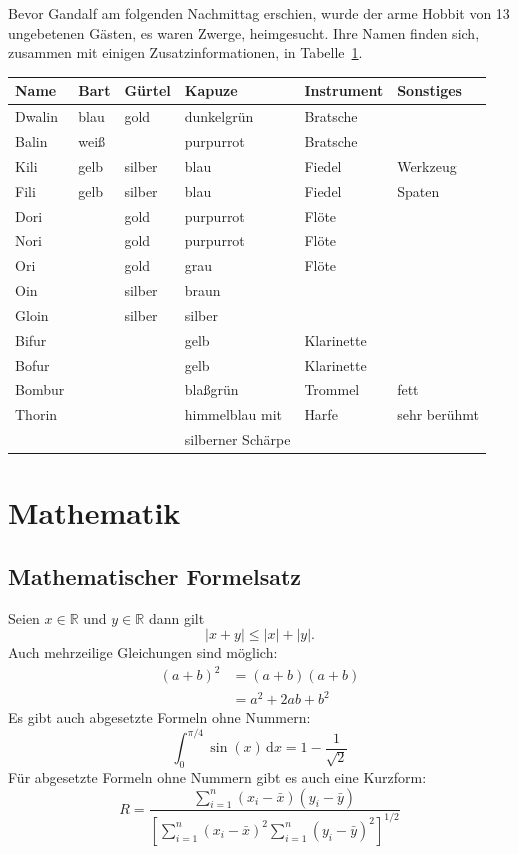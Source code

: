 \documentclass[12pt,a4paper,bibtotoc]{scrreprt}
\begin{document}
Bevor Gandalf am folgenden Nachmittag erschien, wurde der arme Hobbit
von 13 ungebetenen Gästen, es waren Zwerge, heimgesucht. Ihre Namen
finden sich, zusammen mit einigen Zusatzinformationen, in
Tabelle~\ref{tab:zwerge}.
% 
\begin{table}
  \centering
  \label{tab:zwerge}
  \begin{tabular}{l||l|l|l|l|l}
  Name   & Bart & Gürtel & Kapuze & Instrument & Sonstiges \\
  \hline
  Dwalin & blau & gold & dunkelgrün & Bratsche & \\
  Balin & weiß & & purpurrot & Bratsche & \\
  Kili & gelb & silber & blau & Fiedel & Werkzeug \\
  Fili & gelb & silber & blau & Fiedel & Spaten \\
  Dori & & gold & purpurrot & Flöte & \\
  Nori & & gold & purpurrot & Flöte & \\
  Ori & & gold & grau & Flöte & \\
  Oin & & silber & braun & & \\
  Gloin & & silber & silber & & \\
  Bifur & & & gelb & Klarinette & \\
  Bofur & & & gelb & Klarinette & \\
  Bombur & & & blaßgrün & Trommel & fett \\
  Thorin & & & himmelblau mit & Harfe & sehr berühmt \\
         & & & silberner Schärpe & &
  \end{tabular}
\end{table}
%
\chapter{Mathematik}
\label{chap:mathematik}
%
\section{Mathematischer Formelsatz}
Seien \begin{math}x\in\mathbb{R}\end{math} und
$y\in\mathbb{R}$ dann gilt
%
\begin{equation}
  |x+y| \leq |x| + |y|.
\end{equation}
%
Auch mehrzeilige Gleichungen sind möglich:
%
\begin{align}
  (a+b)^{2} & = (a+b)(a+b) \\
           & = a^{2}+2ab+b^{2}
\end{align}
Es gibt auch abgesetzte Formeln ohne Nummern:
%
\begin{equation*}
  \int_{0}^{\pi/4}\sin(x)\,\mathrm{d}x=
  1-\frac{1}{\sqrt{2}}
\end{equation*}
Für abgesetzte Formeln ohne Nummern gibt es auch eine Kurzform:
%
\[
  R=\frac{\sum_{i=1}^{n}(x_{i}-\bar{x})(y_{i}-\bar{y})}{\left[\sum_{i=1}^{n}(x_{i}-\bar{x})^{2}\sum_{i=1}^{n}(y_{i}-\bar{y})^{2}\right]^{1/2}}
\]
%
\end{document}
